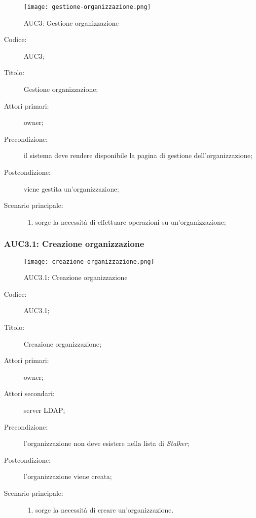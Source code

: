 \documentclass[../../../analisi-dei-requisiti.tex]{subfiles}
\begin{document}
\begin{figure}[H]
  \centering
  \texttt{[image: gestione-organizzazione.png]}
  \caption{AUC3: Gestione organizzazione}%
  \label{fig:AUC3}
\end{figure}

\begin{description}
  \item[Codice:] AUC3;
  \item[Titolo:] Gestione organizzazione;
  \item[Attori primari:] owner;
  \item[Precondizione:] il sistema deve rendere disponibile la pagina di gestione dell'organizzazione;
  \item[Postcondizione:] viene gestita un'organizzazione;
  \item[Scenario principale:]
        \begin{enumerate}
          \item sorge la necessità di effettuare operazioni su un'organizzazione;
        \end{enumerate}
\end{description}

\subsubsection{AUC3.1: Creazione organizzazione}%
\label{subs:AUC3.1}

\begin{figure}[H]
  \centering
  \texttt{[image: creazione-organizzazione.png]}
  \caption{AUC3.1: Creazione organizzazione}%
  \label{fig:AUC3_1}
\end{figure}

\begin{description}
  \item[Codice:] AUC3.1;
  \item[Titolo:] Creazione organizzazione;
  \item[Attori primari:] owner;
  \item[Attori secondari:] server LDAP\@;
  \item[Precondizione:] l'organizzazione non deve esistere nella lista di \emph{Stalker};
  \item[Postcondizione:] l'organizzazione viene creata;
  \item[Scenario principale:]
        \begin{enumerate}
          \item sorge la necessità di creare un'organizzazione.
        \end{enumerate}
\end{description}
\end{document}
